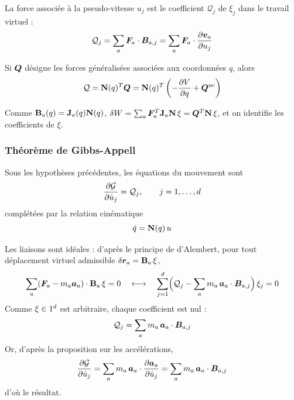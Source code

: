 \begin{definition}
    La force associée à la pseudo-vitesse $u_j$ est le coefficient
    $\mathcal{Q}_j$ de $\xi_j$ dans le travail virtuel :
    \[
        \mathcal{Q}_j = \sum_a\bm{F}_a\cdot\bm{B}_{a,j}
        = \sum_a\bm{F}_a\cdot\frac{\partial \bm{v}_a}{\partial u_j}
    \]
\end{definition}

\begin{proposition}
    Si $\bm{Q}$ désigne les forces généralisées associées aux
    coordonnées $q$, alors
    \[
        \mathcal{Q} = \mathbf{N}(q)^T\bm{Q}
        = \mathbf{N}(q)^T\left(-\frac{\partial V}{\partial q} + \bm{Q}^{\mathrm{nc}}\right)
    \]
\end{proposition}

\begin{demonstration}
    Comme $\mathbf{B}_a (q)= \mathbf{J}_a(q)\mathbf{N}(q)$,
    $\delta W = \sum_a\bm{F}_a^T\mathbf{J}_a\mathbf{N}\,\xi
    = \bm{Q}^T\mathbf{N}\,\xi$, et on identifie les coefficients de
    $\xi$.
\end{demonstration}

\subsubsection{Théorème de Gibbs-Appell}

\begin{theoreme}
    Sous les hypothèses précédentes, les équations du mouvement sont
    \[
        \frac{\partial \mathcal{G}}{\partial \dot u_j} = \mathcal{Q}_j,
        \qquad j = 1,\dots,d
    \]
    complétées par la relation cinématique
    \[
        \dot q = \mathbf{N}(q)\,u
    \]
\end{theoreme}

\begin{demonstration}
    Les liaisons sont idéales : d'après le principe de d'Alembert, pour
    tout déplacement virtuel admissible $\delta\bm{r}_a =
    \mathbf{B}_a\,\xi$,
    \[
        \sum_a(\bm{F}_a - m_a\bm{a}_a)\cdot\mathbf{B}_a\,\xi = 0
        \quad\longleftrightarrow\quad
        \sum_{j=1}^{d}\Bigl(\mathcal{Q}_j
        - \sum_a m_a\,\bm{a}_a\cdot\bm{B}_{a,j}\Bigr)\,\xi_j = 0
    \]
    Comme $\xi\in1^d$ est arbitraire, chaque coefficient est nul :
    \[
        \mathcal{Q}_j = \sum_a m_a\,\bm{a}_a\cdot\bm{B}_{a,j}
    \]
    Or, d'après la proposition sur les accélérations,
    \[
        \frac{\partial \mathcal{G}}{\partial \dot u_j}
        = \sum_a m_a\,\bm{a}_a\cdot\frac{\partial \bm{a}_a}{\partial \dot u_j}
        = \sum_a m_a\,\bm{a}_a\cdot\bm{B}_{a,j}
    \]
    d'où le résultat.
\end{demonstration}

